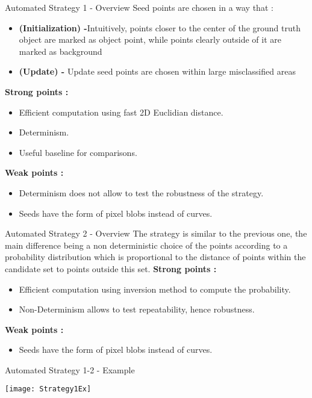 \begin{frame}[t,fragile]{Automated Strategy 1 - Overview}
Seed points are chosen in a way that :
\begin{itemize}
  \item \textbf{(Initialization) -}Intuitively, points closer to the center of the ground truth object are marked as object point, while points clearly outside of it are marked as background
  \item \textbf{(Update) -} Update seed points are chosen within large misclassified areas
\end{itemize}
\textbf{Strong points :}
\begin{itemize}
  \item Efficient computation using fast 2D Euclidian distance. 
  \item Determinism.
  \item Useful baseline for comparisons.
\end{itemize}
\textbf{Weak points :}
\begin{itemize}
  \item Determinism does not allow to test the robustness of the strategy.
  \item Seeds have the form of pixel blobs instead of curves.
\end{itemize}
\end{frame}


\begin{frame}[t,fragile]{Automated Strategy 2 - Overview}
The strategy is similar to the previous one, the main difference being a non deterministic choice of the points according to a probability distribution which is proportional
to the distance of points within the candidate set to points outside this set. \newline
\textbf{Strong points :}
\begin{itemize}
  \item Efficient computation using inversion method to compute the probability.
  \item Non-Determinism allows to test repeatability, hence robustness.
\end{itemize}
\textbf{Weak points :}
\begin{itemize}
  \item Seeds have the form of pixel blobs instead of curves.
\end{itemize}
\end{frame}

\begin{frame}[t,fragile]{Automated Strategy 1-2 - Example}
\begin{center}
\texttt{[image: Strategy1Ex]}
\end{center}
\end{frame}


